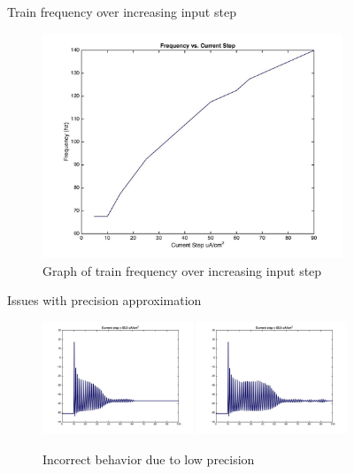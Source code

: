 \documentclass{beamer}
\begin{document}
\begin{frame}{Train frequency over increasing input step}

\begin{figure}
    \centering
    \includegraphics[width = 0.8\textwidth]{./images/freqvscurrent.jpg}
    \caption{Graph of train frequency over increasing input step}
  \end{figure}

\end{frame}


\begin{frame}{Issues with precision approximation}
  \begin{figure}
    \centering
    \includegraphics[width = 0.4\textwidth]{./images/current55p5.jpg}
    \includegraphics[width = 0.4\textwidth]{./images/current55p6.jpg}
    \caption{Incorrect behavior due to low precision}
  \end{figure}
\end{frame}
\end{document}
